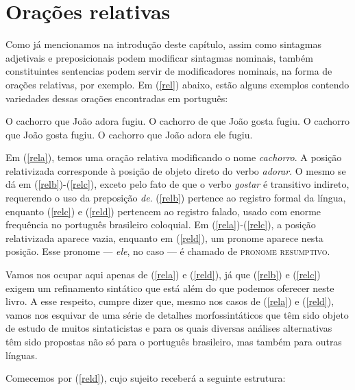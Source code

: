 \section{Orações relativas}

Como já mencionamos na introdução deste capítulo, assim como sintagmas adjetivais e preposicionais podem modificar
sintagmas nominais, também constituintes sentencias podem servir
de modificadores nominais, na forma de orações relativas, por exemplo. Em
(\ref{rel}) abaixo, estão alguns exemplos contendo variedades
dessas orações encontradas em português:


\begin{exe}
    \ex\label{rel}
    \begin{xlist}
        \ex  O cachorro que João adora fugiu.\label{rela}
        \ex  O cachorro de que João gosta fugiu.\label{relb}
        \ex  O cachorro que João gosta fugiu.\label{relc}
        \ex  O cachorro que João adora ele fugiu.\label{reld}
    \end{xlist}
\end{exe}

\n Em (\ref{rela}), temos uma oração relativa modificando o nome
\textit{cachorro}. A posição relativizada corresponde à posição de
objeto direto do verbo \textit{adorar}. O mesmo se dá em
(\ref{relb})-(\ref{relc}), exceto pelo fato de que o verbo
\textit{gostar} é transitivo indireto, requerendo o uso da
preposição \textit{de}. (\ref{relb}) pertence ao registro formal
da língua, enquanto (\ref{relc}) e (\ref{reld}) pertencem ao
registro falado, usado com enorme frequência no português brasileiro coloquial. Em (\ref{rela})-(\ref{relc}), a posição relativizada
aparece vazia, enquanto em (\ref{reld}), um pronome aparece
nesta posição. Esse pronome --- \textit{ele}, no caso --- é chamado de
\textsc{pronome resumptivo}.

Vamos nos ocupar aqui apenas de (\ref{rela}) e (\ref{reld}), já que
(\ref{relb}) e (\ref{relc}) exigem um refinamento sintático que
está além do que podemos oferecer neste livro. A esse respeito,
cumpre dizer que, mesmo nos casos de  (\ref{rela}) e (\ref{reld}),
vamos nos esquivar de uma série de detalhes morfossintáticos que
têm sido objeto de estudo de muitos sintaticistas e para os quais
diversas análises alternativas têm sido propostas não só para o
português brasileiro, mas também para outras línguas.

Comecemos por (\ref{reld}), cujo sujeito receberá a seguinte
estrutura:\\

